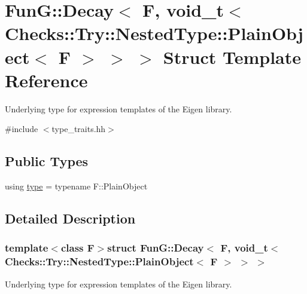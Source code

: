 \hypertarget{structFunG_1_1Decay_3_01F_00_01void__t_3_01Checks_1_1Try_1_1NestedType_1_1PlainObject_3_01F_01_4_01_4_01_4}{\section{Fun\-G\-:\-:Decay$<$ F, void\-\_\-t$<$ Checks\-:\-:Try\-:\-:Nested\-Type\-:\-:Plain\-Object$<$ F $>$ $>$ $>$ Struct Template Reference}
\label{structFunG_1_1Decay_3_01F_00_01void__t_3_01Checks_1_1Try_1_1NestedType_1_1PlainObject_3_01F_01_4_01_4_01_4}
}


Underlying type for expression templates of the Eigen library.  




{\ttfamily \#include $<$type\-\_\-traits.\-hh$>$}

\subsection*{Public Types}
\begin{DoxyCompactItemize}
\item 
using \hyperlink{structFunG_1_1Decay_3_01F_00_01void__t_3_01Checks_1_1Try_1_1NestedType_1_1PlainObject_3_01F_01_4_01_4_01_4_a27b32af38cd1fb109944b71825771648}{type} = typename F\-::\-Plain\-Object
\end{DoxyCompactItemize}


\subsection{Detailed Description}
\subsubsection*{template$<$class F$>$struct Fun\-G\-::\-Decay$<$ F, void\-\_\-t$<$ Checks\-::\-Try\-::\-Nested\-Type\-::\-Plain\-Object$<$ F $>$ $>$ $>$}

Underlying type for expression templates of the Eigen library. 

